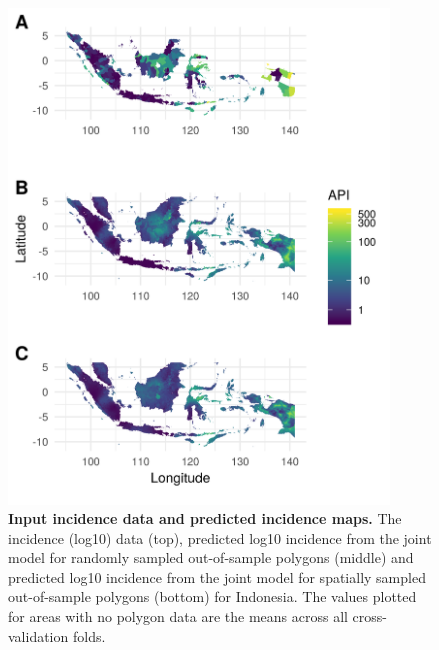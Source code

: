 \documentclass[10pt,letterpaper]{article}
\begin{document}
\begin{figure}[!t]
\includegraphics[width = 0.9\textwidth]{figures/idn_both_cv12_preds.png}
\caption{{\bf Input incidence data and predicted incidence maps. } 
The incidence (log10) data (top), predicted log10 incidence from the joint model for randomly sampled out-of-sample polygons (middle) and predicted log10 incidence from the joint model for spatially sampled out-of-sample polygons (bottom) for Indonesia. The values plotted for areas with no polygon data are the means across all cross-validation folds.
}
\label{predobsmapidn}
\end{figure}
\end{document}
